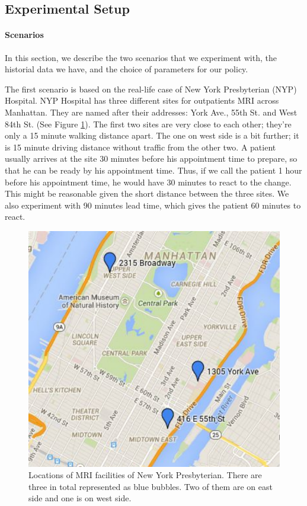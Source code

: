 \subsection{Experimental Setup}

\paragraph{Scenarios}

In this section, we describe the two scenarios that we experiment with,
the historial data we have, and the choice of parameters for our policy.

The first scenario is based on the real-life case of New York Presbyterian
(NYP) Hospital. NYP Hospital has three different sites for outpatients MRI
across Manhattan. They are named after their addresses: York Ave., 55th St. and
West 84th St. (See Figure \ref{fig:site}). The first two sites are very
close to each other; they're only a 15 minute walking distance apart. The one on west side
is a bit further; it is 15 minute driving distance without traffic from the other two.
A patient usually arrives at the site 30 minutes before his appointment
time to prepare, so that he can be ready by his appointment time.
Thus, if we call the patient 1 hour before his appointment time, he
would have 30 minutes to react to the change. This might be reasonable
given the short distance between the three sites. We also experiment with 90 minutes
lead time, which gives the patient 60 minutes to react.

\begin{figure}
\centering
\includegraphics[scale=.6]{chap3/numeric/pic/site.pdf}
\caption{Locations of MRI facilities of New York Presbyterian. There
are three in total represented as blue bubbles. Two of them are on
east side and one is on west side.}
\label{fig:site}
\end{figure}

